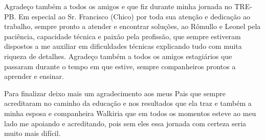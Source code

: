 \begin{agradecimentos}[AGRADECIMENTOS]
    Agradeço também a todos os amigos e que fiz durante minha jornada no TRE-PB. Em especial ao Sr. Francisco (Chico) por toda sua atenção e dedicação ao trabalho, sempre pronto a atender e encontrar soluções, ao Rômullo e Leonel pela paciência, capacidade técnica e paixão pela profissão, que sempre estiveram dispostos a me auxiliar em dificuldades técnicas explicando tudo com muita riqueza de detalhes. Agradeço também a todos os amigos estagiários que passaram durante o tempo em que estive, sempre companheiros prontos a aprender e ensinar.

    Para finalizar deixo mais um agradecimento aos meus Pais que sempre acreditaram no caminho da educação e nos resultados que ela traz e também a minha esposa e companheira Walkiria que em todos os momentos esteve ao meu lado me apoiando e acreditando, pois sem eles essa jornada com certeza seria muito mais difícil.

\end{agradecimentos}

